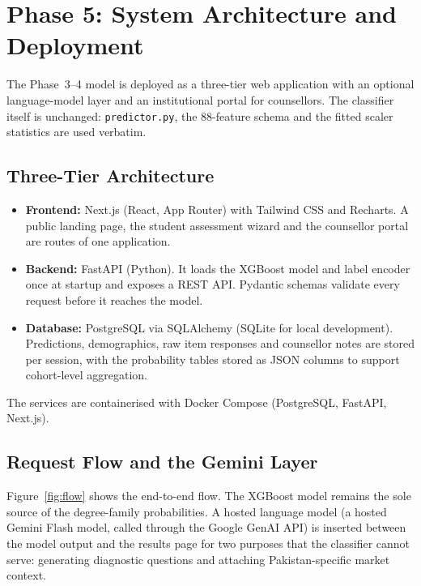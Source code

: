 
\section{Phase 5: System Architecture and Deployment}
\label{sec:architecture}\label{sec:phase5}

The Phase~3--4 model is deployed as a three-tier web application with an
optional language-model layer and an institutional portal for counsellors.
The classifier itself is unchanged: \texttt{predictor.py}, the 88-feature
schema and the fitted scaler statistics are used verbatim.

\subsection{Three-Tier Architecture}
\begin{itemize}
  \item \textbf{Frontend:} Next.js (React, App Router) with Tailwind CSS and
        Recharts. A public landing page, the student assessment wizard and the
        counsellor portal are routes of one application.
  \item \textbf{Backend:} FastAPI (Python). It loads the XGBoost model and label
        encoder once at startup and exposes a REST API. Pydantic schemas
        validate every request before it reaches the model.
  \item \textbf{Database:} PostgreSQL via SQLAlchemy (SQLite for local
        development). Predictions, demographics, raw item responses and
        counsellor notes are stored per session, with the probability tables
        stored as JSON columns to support cohort-level aggregation.
\end{itemize}
The services are containerised with Docker Compose (PostgreSQL, FastAPI,
Next.js).

\subsection{Request Flow and the Gemini Layer}
Figure~\ref{fig:flow} shows the end-to-end flow. The XGBoost model remains the
sole source of the degree-family probabilities. A hosted language model
(a hosted Gemini Flash model, called through the Google GenAI API) is inserted between the
model output and the results page for two purposes that the classifier cannot
serve: generating diagnostic questions and attaching Pakistan-specific market
context.

